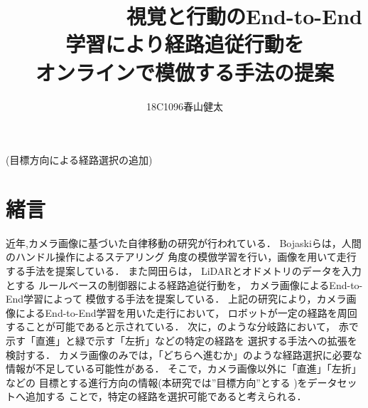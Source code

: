 \documentclass[10pt]{jarticle}
\begin{document}
    
    \makeatletter
  \title{　　　　　　視覚と行動のEnd-to-End学習により経路追従行動を　　　　　　オンラインで模倣する手法の提案}
        {(目標方向による経路選択の追加)}
    
    \author{18C1096\hspace{.5zw}春山健太}
    
    \makeatother
    
    
    \maketitle
    
    
    \section{緒\hspace{2zw}言}%
    近年,カメラ画像に基づいた自律移動の研究が行われている．%
    Bojaskiら\cite{nvidia}は，人間のハンドル操作によるステアリング
    角度の模倣学習を行い，画像を用いて走行する手法を提案している．
    また岡田ら\cite{okada}は，
    LiDARとオドメトリのデータを入力とする
    ルールべースの制御器による経路追従行動を，
    カメラ画像によるEnd-to-End学習によって
    模倣する手法を提案している．
    上記の研究により，カメラ画像によるEnd-to-End学習を用いた走行において，
    ロボットが一定の経路を周回することが可能であると示されている．
    次に，のような分岐路において，
    赤で示す「直進」と緑で示す「左折」などの特定の経路を
    選択する手法への拡張を検討する．
    カメラ画像のみでは，「どちらへ進むか」のような経路選択に必要な情報が不足している可能性がある．
    そこで，カメラ画像以外に「直進」「左折」などの
    目標とする進行方向の情報(本研究では”目標方向”とする )をデータセットへ追加する
    ことで，特定の経路を選択可能であると考えられる．
\end{document}
